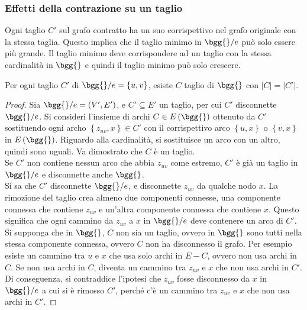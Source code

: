 \subsubsection{Effetti della contrazione su un taglio}

Ogni taglio $C'$ sul grafo contratto ha un suo corrispettivo nel grafo originale con la stessa taglia.
Questo implica che il taglio minimo in $
\bgg{} / e
$ può solo essere più grande.
Il taglio minimo deve corrispondere ad un taglio con la stessa cardinalità in $\bgg{}$ e quindi il taglio minimo può solo crescere.
\begin{theorem}
    Per ogni 
    taglio $C'$ di $
    \bgg{} / e
    = \left\{ u,v \right\}
    $,
    esiste
    $C$ taglio di $
    \bgg{}
    $ con $|C|=|C'|$.
\end{theorem}
\begin{proof}
    Sia $
    \bgg{} / e 
    =
    \left( V', E' \right)
    $, e $
    C' \subseteq E'
    $ un taglio, per cui $
    C'
    $ disconnette $
    \bgg{} / e 
    $.
    Si consideri l'insieme di archi $
    C \in E\left( \bgg{} \right)
    $ ottenuto da $C'$ sostituendo ogni archo $
    \left\{ 
        z_{uv}, x
    \right\}
    \in C'
    $ con il corrispettivo arco $
    \left\{ u,x \right\}
    $ o $
    \left\{ v,x \right\}
    $ in $
    E \left( \bgg{} \right)
    $.
    Riguardo alla cardinalità, si sostituisce un arco con un altro, quindi sono uguali.
    Va dimostrato che $C$ è un taglio.
    \\
    Se $C'$ non contiene nessun arco che abbia $
    z_{uv}
    $ come estremo, $C'$ è già un taglio in $
    \bgg{} / e
    $ e disconnette anche $
    \bgg{}
    $.
    \\
    Si sa che $C'$ disconnette $
    \bgg{} / e
    $, e disconnette $
    z_{uv}
    $ da qualche nodo $x$.
    La rimozione del taglio crea almeno due componenti connesse, 
    una componente connessa che contiene $
    z_{uv}
    $ e un'altra componente connessa che contiene $x$.
    Questo significa che ogni cammino da $
    z_{uv}
    $ a $x$ in $
    \bgg{} / e
    $ deve contenere un arco di $C'$.
    \\
    Si supponga che in $
    \bgg{}
    $, $C$ non sia un taglio, ovvero in $
    \bgg{}
    $ sono tutti nella stessa componente connessa, ovvero $C$ non ha disconnesso il grafo.
    Per esempio esiste un cammino tra $u$ e $x$ che usa solo archi in $E - C$, ovvero non usa archi in $C$.
    Se non usa archi in $C$, diventa un cammino tra $
    z_{uv}
    $ e $x$ che non usa archi in $C'$.
    Di conseguenza, si contraddice l'ipotesi che $
    z_{uv}
    $ fosse disconnesso da $x$ in $
    \bgg{} / e
    $ a cui si è rimosso $C'$, perché c'è un cammino tra $
    z_{uv}
    $ e $x$ che non usa archi in $C'$.
\end{proof}
